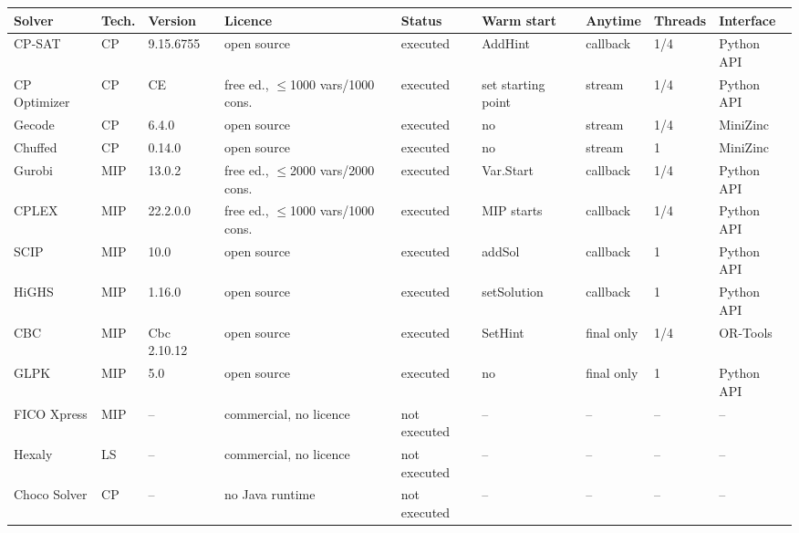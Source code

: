 \begin{tabular}{lllllllll}
\toprule
Solver & Tech. & Version & Licence & Status & Warm start & Anytime & Threads & Interface \\
\midrule
CP-SAT & CP & 9.15.6755 & open source & executed & AddHint & callback & 1/4 & Python API \\
CP Optimizer & CP & CE & free ed., $\le$1000 vars/1000 cons. & executed & set starting point & stream & 1/4 & Python API \\
Gecode & CP & 6.4.0 & open source & executed & no & stream & 1/4 & MiniZinc \\
Chuffed & CP & 0.14.0 & open source & executed & no & stream & 1 & MiniZinc \\
Gurobi & MIP & 13.0.2 & free ed., $\le$2000 vars/2000 cons. & executed & Var.Start & callback & 1/4 & Python API \\
CPLEX & MIP & 22.2.0.0 & free ed., $\le$1000 vars/1000 cons. & executed & MIP starts & callback & 1/4 & Python API \\
SCIP & MIP & 10.0 & open source & executed & addSol & callback & 1 & Python API \\
HiGHS & MIP & 1.16.0 & open source & executed & setSolution & callback & 1 & Python API \\
CBC & MIP & Cbc 2.10.12 & open source & executed & SetHint & final only & 1/4 & OR-Tools \\
GLPK & MIP & 5.0 & open source & executed & no & final only & 1 & Python API \\
\midrule
FICO Xpress & MIP & -- & commercial, no licence & not executed & -- & -- & -- & -- \\
Hexaly & LS & -- & commercial, no licence & not executed & -- & -- & -- & -- \\
Choco Solver & CP & -- & no Java runtime & not executed & -- & -- & -- & -- \\
\bottomrule
\end{tabular}
